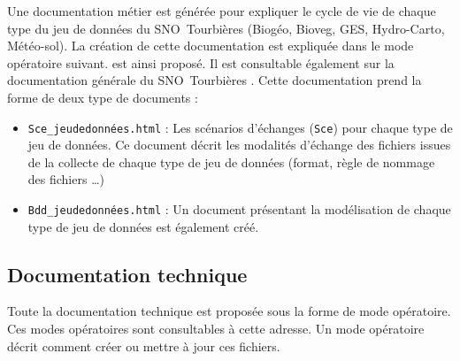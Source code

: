 \documentclass[]{article}
\newcommand{\mhref}[3][blue]{\href{#2}{\color{#1}{#3}}}%
\newcommand{\SNOT}{{SNO~Tourbières }}
\def\adressedocsmetier{https://forge-osuc.cnrs-orleans.fr/projects/sie-sno-tourbiere/repository/revisions/master/entry/Documentation/Docs_metier/}
\begin{document}
Une documentation métier est générée pour expliquer le cycle de vie de chaque type du jeu de données du \SNOT (Biogéo, Bioveg, GES, Hydro-Carto, Météo-sol). La création de cette documentation est expliquée dans le mode opératoire suivant. %
\mhref{\adressedocsmetier/Sce_modele.html}{Un modèle de scénario d'échange} est ainsi proposé.
Il est consultable également sur la documentation générale du \SNOT.
Cette documentation prend la forme de deux type de documents :
\begin{itemize}
	\item \texttt{Sce\_jeudedonnées.html} : Les scénarios d'échanges (\texttt{Sce}) pour chaque type de jeu de données. Ce document décrit les modalités d'échange des fichiers issues de la collecte de chaque type de jeu de données (format, règle de nommage des fichiers \dots)
	\item \texttt{Bdd\_jeudedonnées.html} : Un document présentant la modélisation de chaque type de jeu de données est également créé.
\end{itemize}

\subsection{Documentation technique}

Toute la documentation technique est proposée sous la forme de mode opératoire. Ces modes opératoires sont consultables à cette adresse. Un mode opératoire décrit comment créer ou mettre à jour ces fichiers.
\end{document}
